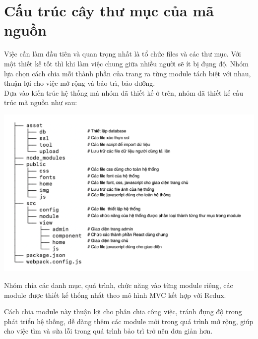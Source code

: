 \section{Cấu trúc cây thư mục của mã nguồn}
Việc cần làm đầu tiên và quan trọng nhất là tổ chức files và các thư mục. Với một thiết kế tốt thì khi làm việc chung giữa nhiều người sẽ ít bị đụng độ. Nhóm lựa chọn cách chia mỗi thành phần của trang ra từng module tách biệt với nhau, thuận lợi cho việc mở rộng và bảo trì, bảo dưỡng.\\

Dựa vào kiến trúc hệ thống mà nhóm đã thiết kế ở trên, nhóm đã thiết kế cấu trúc mã nguồn như sau:
\begin{center}
  \captionsetup{type=figure}
  \includegraphics[width=15cm]{img/tree.png}
\end{center}

Nhóm chia các danh mục, quá trình, chức năng vào từng module riêng, các module được thiết kế thống nhất theo mô hình MVC kết hợp với Redux. 

Cách chia module này thuận lợi cho phân chia công việc, tránh đụng độ trong phát triển hệ thống, dễ dàng thêm các module mới trong quá trình mở rộng, giúp cho việc tìm và sửa lỗi trong quá trình bảo trì trở nên đơn giản hơn.

